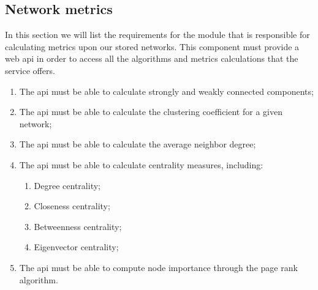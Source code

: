 \subsection{Network metrics}
\label{subsec:networkmetrics}

In this section we will list the requirements for the module that is responsible for calculating metrics upon our stored networks. This component must
provide a web \gls{api} in order to access all the algorithms and metrics calculations that the service offers.

\begin{enumerate}
    \item The \gls{api} must be able to calculate strongly and weakly connected components;
    \item The \gls{api} must be able to calculate the clustering coefficient for a given network;
    \item The \gls{api} must be able to calculate the average neighbor degree;
    \item The \gls{api} must be able to calculate centrality measures, including:
    \begin{enumerate}
        \item Degree centrality;
        \item Closeness centrality;
        \item Betweenness centrality;
        \item Eigenvector centrality;
    \end{enumerate}
    \item The \gls{api} must be able to compute node importance through the page rank algorithm.
\end{enumerate}

